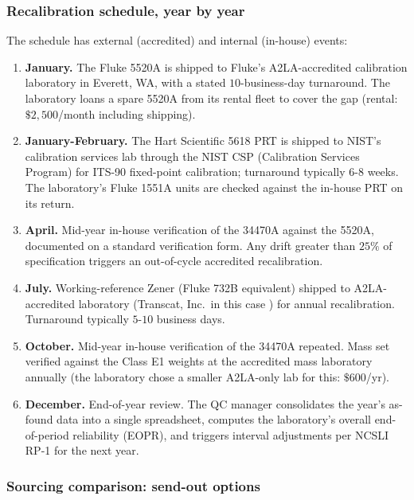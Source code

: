 \subsubsection*{Recalibration schedule, year by year}

The schedule has external (accredited) and internal (in-house)
events:
\begin{enumerate}[leftmargin=*]
  \item \textbf{January.} The Fluke 5520A
    \cite{web:ch03t3-fluke-5520a} is shipped to Fluke's
    A2LA-accredited calibration laboratory in Everett, WA, with
    a stated $10$-business-day turnaround. The laboratory loans
    a spare 5520A from its rental fleet to cover the gap
    (rental: $\$2{,}500$/month including shipping).
  \item \textbf{January-February.} The Hart Scientific 5618 PRT
    \cite{web:ch03t3b-hart-5618} is shipped to NIST's calibration
    services lab through the NIST CSP (Calibration Services
    Program) for ITS-90 fixed-point calibration; turnaround
    typically $6$-$8$ weeks. The laboratory's Fluke 1551A units
    are checked against the in-house PRT on its return.
  \item \textbf{April.} Mid-year in-house verification of the
    34470A \cite{web:ch03t3-keysight-34470a} against the 5520A,
    documented on a standard verification form. Any drift greater
    than $25\%$ of specification triggers an out-of-cycle
    accredited recalibration.
  \item \textbf{July.} Working-reference Zener (Fluke 732B
    equivalent) shipped to A2LA-accredited laboratory (Transcat,
    Inc.\ in this case \cite{web:ch03t3b-transcat}) for annual
    recalibration. Turnaround typically $5$-$10$ business days.
  \item \textbf{October.} Mid-year in-house verification of the
    34470A repeated. Mass set verified against the Class E1
    weights at the accredited mass laboratory annually (the
    laboratory chose a smaller A2LA-only lab for this:
    $\$600$/yr).
  \item \textbf{December.} End-of-year review. The QC manager
    consolidates the year's as-found data into a single
    spreadsheet, computes the laboratory's overall
    end-of-period reliability (EOPR), and triggers interval
    adjustments per NCSLI RP-1 \cite{web:ch03t3-ncsli-rp-1-2010}
    for the next year.
\end{enumerate}

\subsubsection*{Sourcing comparison: send-out options}

